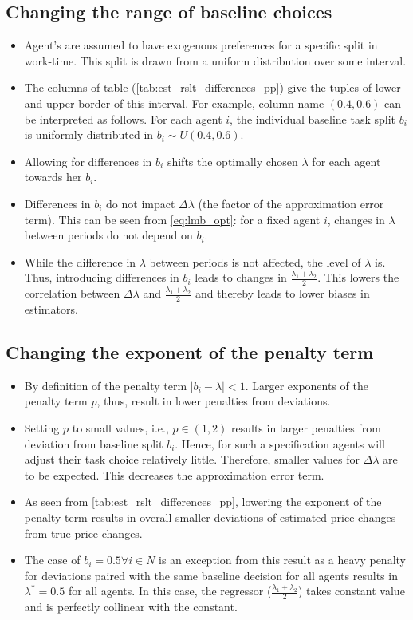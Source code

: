 \documentclass{article}
\begin{document}
	\subsection{Changing the range of baseline choices}
		\begin{itemize}
			\item{Agent's are assumed to have exogenous preferences for a specific split in work-time. This split is drawn from a uniform distribution over some interval.}
			\item{The columns of table (\ref{tab:est_rslt_differences_pp}) give the tuples of lower and upper border of this interval. For example, column name $(0.4, 0.6)$ can be interpreted as follows. For each agent $i$, the individual baseline task split $b_i$ is uniformly distributed in $b_i \sim U(0.4, 0.6)$}.
			\item{Allowing for differences in $b_i$ shifts the optimally chosen $\lambda$ for each agent towards her $b_i$.}
			\item{Differences in $b_i$ do not impact $\Delta \lambda$ (the factor of the approximation error term). This can be seen from \ref{eq:lmb_opt}: for a fixed agent $i$, changes in $\lambda$ between periods do not depend on $b_i$.}
			\item{While the difference in $\lambda$ between periods is not affected, the level of $\lambda$ is. Thus, introducing differences in $b_i$ leads to changes in $\frac{\lambda_1+\lambda_2}{2}$. This lowers the correlation between $\Delta \lambda$ and $\frac{\lambda_1+\lambda_2}{2}$ and thereby leads to lower biases in estimators.}
		\end{itemize}
	\subsection{Changing the exponent of the penalty term}
		\begin{itemize}
			\item{By definition of the penalty term $|b_i - \lambda| < 1$. Larger exponents of the penalty term $p$, thus, result in lower penalties from deviations.}
			\item{Setting $p$ to small values, i.e., $ p \in (1, 2)$ results in larger penalties from deviation from baseline split $b_i$. Hence, for such a specification agents will adjust their task choice relatively little. Therefore, smaller values for $\Delta \lambda$ are to be expected. This decreases the approximation error term.}
			\item{As seen from \ref{tab:est_rslt_differences_pp}, lowering the exponent of the penalty term results in overall smaller deviations of estimated price changes from true price changes.}
			\item{The case of $b_i = 0.5 \forall i \in N$ is an exception from this result as a heavy penalty for deviations paired with the same baseline decision for all agents results in $\lambda^* = 0.5$ for all agents. In this case, the regressor ($\frac{\lambda_1+\lambda_2}{2}$) takes constant value and is perfectly collinear with the constant.}
		\end{itemize}
\end{document}
